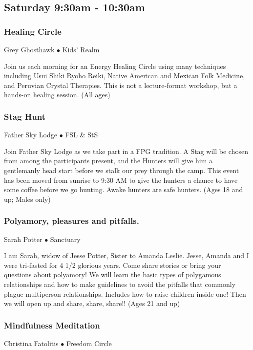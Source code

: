 

\subsection{Saturday 9:30am - 10:30am}

\subsubsection{Healing Circle}
\label{Sat-Healing3}
{\small Grey Ghosthawk $\bullet$  Kids' Realm}

 Join us each morning for an Energy Healing Circle using many techniques including Usui Shiki Ryoho Reiki, Native American and Mexican Folk Medicine, and Peruvian Crystal Therapies. This is not a lecture-format workshop, but a hands-on healing session.  {\small (All ages)}

\subsubsection{Stag Hunt}
\label{Sat-Stag}
{\small Father Sky Lodge $\bullet$  FSL \& StS}

 Join Father Sky Lodge as we take part in a FPG tradition. A Stag will be chosen from among the participants present, and the Hunters will give him a gentlemanly head start before we stalk our prey through the camp. This event has been moved from sunrise to 9:30 AM to give the hunters a chance to have some coffee before we go hunting. Awake hunters are safe hunters.  {\small (Ages 18 and up; Males only)}

\subsubsection{Polyamory, pleasures and pitfalls.}
\label{Sat-Potter1}
{\small Sarah Potter $\bullet$  Sanctuary}

 I am Sarah, widow of Jesse Potter, Sister to Amanda Leslie. Jesse, Amanda and I were tri-fasted for 4 1/2 glorious years. Come share stories or bring your questions about polyamory! We will learn the basic types of polygamous relationships and how to make guidelines to avoid the pitfalls that commonly plague multiperson relationships. Includes how to raise children inside one! 
Then we will open up and share, share, share!! {\small (Ages 21 and up)}

\subsubsection{Mindfulness Meditation}
\label{Sat-Fatolitis3}
{\small Christina Fatolitis $\bullet$  Freedom Circle}

